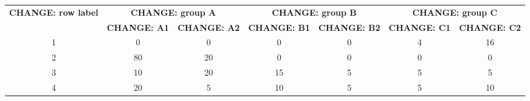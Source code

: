 \begin{frame}
\begin{overlayarea}{\textwidth}{.75\textheight}
{                %
                \begin{adjustbox}{max totalsize={.675\linewidth}{\textheight},center}
                    \scriptsize
                    \begin{tabular}{c|cc|cc|cc}
                        \toprule
                        \multirow{2}{*}{\textbf{CHANGE: row label}} & \multicolumn{2}{c|}{\textbf{CHANGE: group A}} & \multicolumn{2}{c|}{\textbf{CHANGE: group B}} & \multicolumn{2}{c}{\textbf{CHANGE: group C}}                                                                                                                                \\
                                                                    & \multicolumn{1}{c}{\textbf{CHANGE: A1}}       & \multicolumn{1}{c|}{\textbf{CHANGE: A2}}      & \multicolumn{1}{c}{\textbf{CHANGE: B1}}      & \multicolumn{1}{c|}{\textbf{CHANGE: B2}} & \multicolumn{1}{c}{\textbf{CHANGE: C1}} & \multicolumn{1}{c}{\textbf{CHANGE: C2}} \\
                        \midrule
                        1                                           & 0                                             & 0                                             & 0                                            & 0                                        & 4                                       & 16                                      \\
                        2                                           & 80                                            & 20                                            & 0                                            & 0                                        & 0                                       & 0                                       \\
                        3                                           & 10                                            & 20                                            & 15                                           & 5                                        & 5                                       & 5                                       \\
                        4                                           & 20                                            & 5                                             & 10                                           & 5                                        & 5                                       & 10                                      \\
                        \bottomrule
                    \end{tabular}
                \end{adjustbox}
            }
    \end{overlayarea}

\end{frame}

